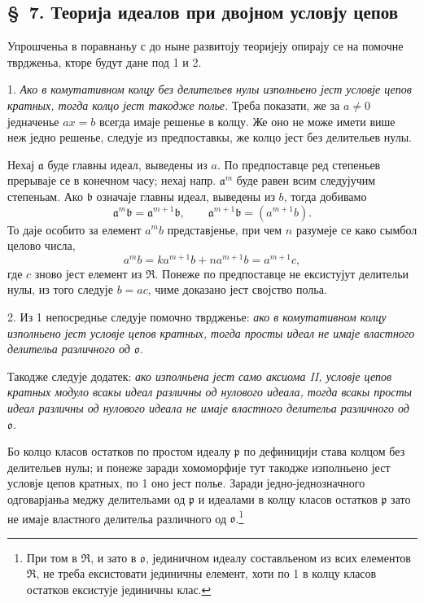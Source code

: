 \documentclass[11pt]{article}
\providecommand{\mR}{\mathfrak{R}}
\providecommand{\ma}{\mathfrak{a}}
\providecommand{\mb}{\mathfrak{b}}
\providecommand{\mo}{\mathfrak{o}}
\providecommand{\mpideal}{\mathfrak{p}}
\begin{document}
\setcounter{footnote}{28}

\subsection*{\S~7. Теорија идеалов при двојном условју цепов}

Упрошченьа в поравнаньу с до ныне развитоју теоријеју опирају се на помочне тврдженьа, кторе будут дане под 1 и 2.

1. \emph{Ако в комутативном колцу без делительев нулы изполньено јест условје цепов кратных, тогда колцо јест такодже полье.} Треба показати, же за $a\ne0$ једначенье $ax=b$ всегда имаје решенье в колцу. Же оно не може имети више неж једно решенье, следује из предпоставкы, же колцо јест без делительев нулы.

Нехај $\ma$ буде главны идеал, выведены из $a$. По предпоставце ред степеньев прерываје се в конечном часу; нехај напр. $\ma^m$ буде равен всим следујучим степеньам. Ако $\mb$ означаје главны идеал, выведены из $b$, тогда добивамо
\[
\ma^m\mb=\ma^{m+1}\mb,
\qquad \ma^{m+1}\mb=(a^{m+1}b).
\]
То даје особито за елемент $a^m b$ представјенье, при чем $n$ разумеје се како сымбол целово числа,
\[
 a^m b=k a^{m+1}b+n a^{m+1}b=a^{m+1}c,
\]
где $c$ зново јест елемент из $\mR$. Понеже по предпоставце не ексистујут делительи нулы, из того следује $b=ac$, чиме доказано јест својство польа.

2. Из 1 непосреднье следује помочно тврдженье: \emph{ако в комутативном колцу изполньено јест условје цепов кратных, тогда просты идеал не имаје властного делительа различного од $\mo$.}

Такодже следује додатек: \emph{ако изполньена јест само аксиома II, условје цепов кратных модуло всакы идеал различны од нулового идеала, тогда всакы просты идеал различны од нулового идеала не имаје властного делительа различного од $\mo$.}

Бо колцо класов остатков по простом идеалу $\mpideal$ по дефиницији става колцом без делительев нулы; и понеже заради хомоморфије тут такодже изполньено јест условје цепов кратных, по 1 оно јест полье. Заради једно-једнозначного одговарјаньа меджу делительами од $\mpideal$ и идеалами в колцу класов остатков $\mpideal$ зато не имаје властного делительа различного од $\mo$.\footnote{При том в $\mR$, и зато в $\mo$, јединичном идеалу составльеном из всих елементов $\mR$, не треба ексистовати јединичны елемент, хоти по 1 в колцу класов остатков ексистује јединичны клас.}
\end{document}
